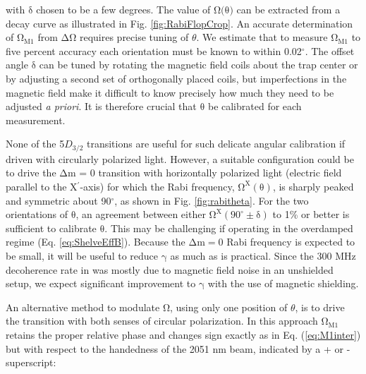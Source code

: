 \documentclass[%
 reprint,
 amsmath,amssymb,
 aps,
]{revtex4-1}
\begin{document}
\noindent with $\mathrm{\delta}$ chosen to be a few degrees.  The value of $\mathrm{\Omega\big( \theta \big)}$ can be extracted from a decay curve as illustrated in Fig. \ref{fig:RabiFlopCrop}.  An accurate determination of $\mathrm{\Omega_{M1}}$ from $\mathrm{\Delta \Omega}$ requires precise tuning of $\theta$.  We estimate that to measure $\mathrm{\Omega_{M1}}$ to five percent accuracy each orientation must be known to within 0.02$^{\circ}$.  The offset angle $\mathrm{\delta}$ can be tuned by rotating the magnetic field coils about the trap center or by adjusting a second set of orthogonally placed coils, but imperfections in the magnetic field make it difficult to know precisely how much they need to be adjusted \emph{a priori}.  It is therefore crucial that $\mathrm{\theta}$ be calibrated for each measurement.

\indent None of the 5$D_{3/2}$ transitions are useful for such delicate angular calibration if driven with circularly polarized light.  However, a suitable configuration could be to drive the $\mathrm{\Delta}$m = 0 transition with horizontally polarized light (electric field parallel to the X$^{'}$-axis) for which the Rabi frequency, $\mathrm{\Omega^{X}(\theta)}$, is sharply peaked and symmetric about 90$^{\circ}$, as shown in Fig. \ref{fig:rabitheta}.  For the two orientations of $\mathrm{\theta}$, an agreement between either $\mathrm{\Omega^{X}(90^{\circ}\pm \delta)}$ to 1\% or better is sufficient to calibrate $\mathrm{\theta}$.  This may be challenging if operating in the overdamped regime (Eq. \ref{eq:ShelveEffB}).  Because the $\mathrm{\Delta m=0}$ Rabi frequency is expected to be small, it will be useful to reduce $\mathrm{\gamma}$ as much as is practical.  Since the 300 MHz decoherence rate in \cite{Hoffman12} was mostly due to magnetic field noise in an unshielded setup, we expect significant improvement to $\mathrm{\gamma}$ with the use of magnetic shielding.

\indent An alternative method to modulate $\mathrm{\Omega}$, using only one position of $\theta$, is to drive the transition with both senses of circular polarization.  In this approach $\mathrm{\Omega_{M1}}$ retains the proper relative phase and changes sign exactly as in Eq. (\ref{eq:M1inter}) but with respect to the handedness of the 2051 nm beam, indicated by a + or - superscript:
	
\end{document}
